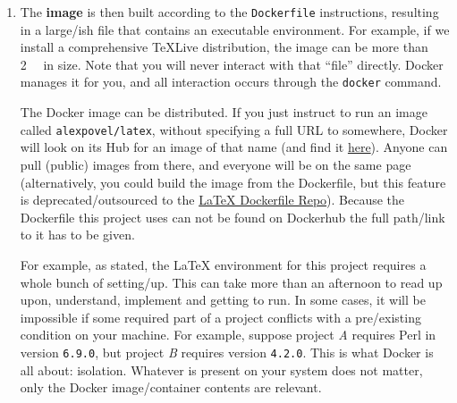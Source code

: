 \begin{enumerate}
        The Dockerfile this project uses for LaTeX stuff is here:
        \begin{center}
          \url{https://collaborating.tuhh.de/m21/public/theses/latex_dockerfile}
        \end{center}
        It is not as simple, so not as suited for an example.
        Its length gives you an idea of the setup required to compile this \LaTeX{} document.
        All of that complexity is of no concern to you when using Docker!
        Of course, such an image also works for much simpler documents.

        If you require custom additions, you can always inherit from existing base images:
        \begin{verbatim}
            FROM https://collaborating.tuhh.de/m21/public/theses/latex\_dockerfile

            # ... Your stuff goes here ...
        \end{verbatim}
  \item The \textbf{image} is then built according to the \texttt{Dockerfile} instructions,
        resulting in a large\-/ish file that contains an executable environment.
        For example, if we install a comprehensive TeXLive distribution, the image can be
        more than \qty{2}{\giga\byte} in size.
        Note that you will never interact with that \enquote{file} directly.
        Docker manages it for you, and all interaction occurs through the \texttt{docker} command.

        The Docker image can be distributed.
        If you just instruct to run an image called  \texttt{alexpovel/latex}, without
        specifying a full URL to somewhere, Docker will look on its Hub for an image of that
        name (and find it \href{https://hub.docker.com/r/alexpovel/latex}{here}).
        Anyone can pull (public) images from there, and everyone will
        be on the same page (alternatively, you could build the image from the Dockerfile, but this feature is
        deprecated/outsourced to the \href{https://collaborating.tuhh.de/m21/public/theses/latex_dockerfile}{LaTeX{} Dockerfile Repo}).
        Because the Dockerfile this project uses can not be found on Dockerhub the full path/link to it has to be given.

        For example, as stated, the \LaTeX{} environment for this project requires a whole bunch of setting\-/up.
        This can take more than an afternoon to read up upon, understand, implement and getting to run.
        In some cases, it will be impossible if some required part of a project conflicts
        with a pre\-/existing condition on your machine.
        For example, suppose project \emph{A} requires Perl in version \texttt{6.9.0},
        but project \emph{B} requires version \texttt{4.2.0}.
        This is what Docker is all about: isolation.
        Whatever is present on your system does not matter, only the Docker image/container
        contents are relevant.


\end{enumerate}

